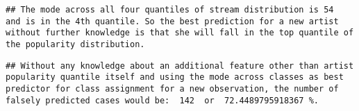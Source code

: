 \documentclass[
]{article}
\newenvironment{Shaded}{\begin{snugshade}}{\end{snugshade}}
\newcommand{\DecValTok}[1]{\textcolor[rgb]{0.00,0.00,0.81}{#1}}
\newcommand{\KeywordTok}[1]{\textcolor[rgb]{0.13,0.29,0.53}{\textbf{#1}}}
\newcommand{\NormalTok}[1]{#1}
\newcommand{\OperatorTok}[1]{\textcolor[rgb]{0.81,0.36,0.00}{\textbf{#1}}}
\newcommand{\StringTok}[1]{\textcolor[rgb]{0.31,0.60,0.02}{#1}}
\begin{document}
\begin{verbatim}
## The mode across all four quantiles of stream distribution is 54  and is in the 4th quantile. So the best prediction for a new artist without further knowledge is that she will fall in the top quantile of the popularity distribution.
\end{verbatim}

\begin{Shaded}
\end{Shaded}

\begin{verbatim}
## Without any knowledge about an additional feature other than artist popularity quantile itself and using the mode across classes as best predictor for class assignment for a new observation, the number of falsely predicted cases would be:  142  or  72.4489795918367 %.
\end{verbatim}
\end{document}
